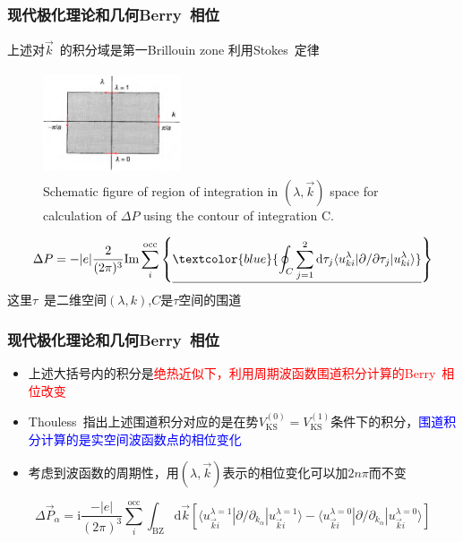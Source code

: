 \frame
{
	\frametitle{现代极化理论和几何\textrm{Berry~}相位}
	上述对$\vec k$~的积分域是第一\textrm{Brillouin zone}
	利用\textrm{Stokes~}定律
\begin{figure}[h!]
\centering
\vspace*{-0.12in}
\includegraphics[height=1.2in,width=1.6in,viewport=0 0 800 540,clip]{Figures/Berry_contour_integration.png}
\caption{\tiny \textrm{Schematic figure of region of integration in $(\lambda,\vec k)$ space for calculation of $\Delta P$ using the contour of integration C.}}%
\label{Berry_contour_integration}
\end{figure} 
	\begin{displaymath}
		\Delta P=-|e|\frac2{(2\pi)^3}\mathrm{Im}\sum_i^{\mathrm{occ}}\left\{ \underline{\textcolor{blue}{\oint_C\sum_{j=1}^2\mathrm{d}\tau_j\langle u_{k i}^{\lambda}|\partial/\partial\tau_j|u_{k i}^{\lambda}\rangle}} \right\} 
	\end{displaymath}
这里$\tau$~是二维空间$(\lambda,k)$,$C$是$\tau$空间的围道
}

\frame
{
	\frametitle{现代极化理论和几何\textrm{Berry~}相位}
	\begin{itemize}
		\item 上述大括号内的积分是\textcolor{red}{绝热近似下，利用周期波函数围道积分计算的\textrm{Berry~}相位改变}%
		\item \textrm{Thouless~}指出上述围道积分对应的是在势$V_{\mathrm{KS}}^{(0)}=V_{\mathrm{KS}}^{(1)}$条件下的积分，\textcolor{blue}{围道积分计算的是实空间波函数点的相位变化}
		\item 考虑到波函数的周期性，用$(\lambda,\vec k)$表示的相位变化可以加$2n\pi$而不变
	\end{itemize}
	\begin{displaymath}
		\Delta\vec P_{\alpha}=\mathrm{i}\frac{-|e|}{(2\pi)^3}\sum_i^{\mathrm{occ}}\int_{\mathrm{BZ}}\mathrm{d}\vec k\left[ \langle u_{\vec k i}^{\lambda=1}|\partial/\partial_{k_{\alpha}}|u_{\vec k i}^{\lambda=1}\rangle-\langle u_{\vec k i}^{\lambda=0}|\partial/\partial_{k_{\alpha}}|u_{\vec k i}^{\lambda=0}\rangle \right]
	\end{displaymath}
}

